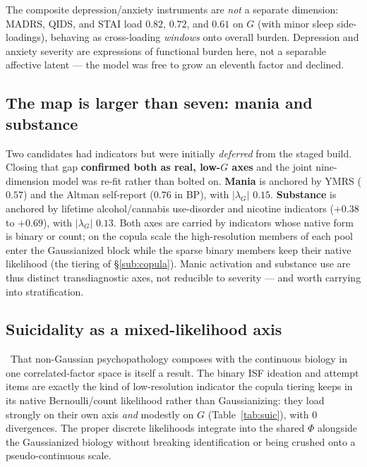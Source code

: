 The composite depression/anxiety instruments are \emph{not} a separate dimension: MADRS, QIDS, and STAI load
$0.82$, $0.72$, and $0.61$ on $G$ (with minor sleep side-loadings), behaving as cross-loading \emph{windows}
onto overall burden. Depression and anxiety severity are expressions of functional burden here, not a separable
affective latent --- the model was free to grow an eleventh factor and declined.

\subsection{The map is larger than seven: mania and substance}
Two candidates had indicators but were initially \emph{deferred} from the staged build. Closing that gap
\textbf{confirmed both as real, low-$G$ axes} and the joint nine-dimension model was re-fit rather than
bolted on. \textbf{Mania} is anchored by YMRS ($0.57$) and the Altman self-report ($0.76$ in BP), with
$|\lambda_G|$ $0.15$. \textbf{Substance} is anchored by lifetime alcohol/cannabis use-disorder and nicotine
indicators ($+0.38$ to $+0.69$), with $|\lambda_G|$ $0.13$. Both axes are carried by indicators whose native
form is binary or count; on the copula scale the high-resolution members of each pool enter the Gaussianized
block while the sparse binary members keep their native likelihood (the tiering of \S\ref{sub:copula}). Manic
activation and substance use are thus distinct transdiagnostic axes, not reducible to severity --- and worth
carrying into stratification.

\subsection{Suicidality as a mixed-likelihood axis}
\documented\ That non-Gaussian psychopathology composes with the continuous biology in one correlated-factor
space is itself a result. The binary ISF ideation and attempt items are exactly the kind of low-resolution
indicator the copula tiering keeps in its native Bernoulli/count likelihood rather than Gaussianizing: they
load strongly on their own axis \emph{and} modestly on $G$ (Table~\ref{tab:suic}), with $0$ divergences. The
proper discrete likelihoods integrate into the shared $\Phi$ alongside the Gaussianized biology without
breaking identification or being crushed onto a pseudo-continuous scale.

